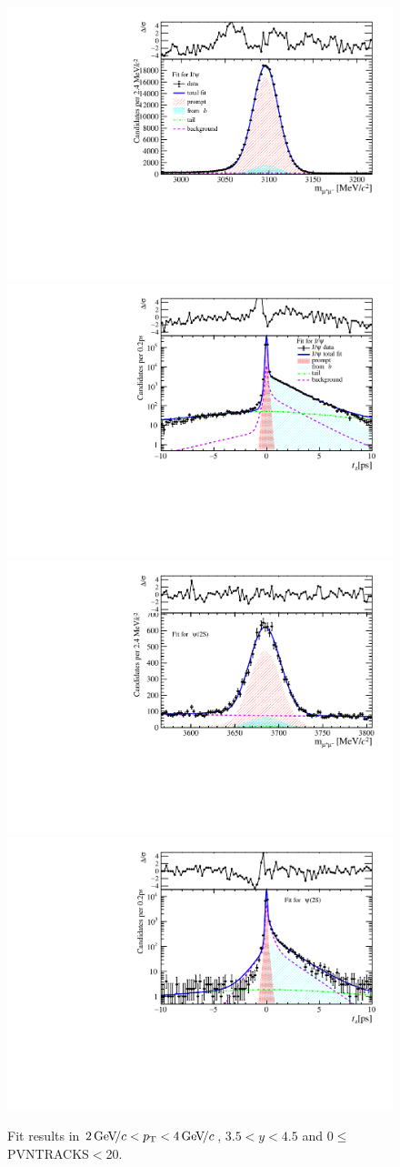 \begin{figure}[H]
\begin{center}
\includegraphics[width=0.47\linewidth]{pdf/Jpsi/drawmass/n1y3pt2.pdf}
\includegraphics[width=0.47\linewidth]{pdf/Jpsi/2DFit/n1y3pt2.pdf}
\vspace*{-0.5cm}
\includegraphics[width=0.47\linewidth]{pdf/Psi2S/drawmass/n1y3pt2.pdf}
\includegraphics[width=0.47\linewidth]{pdf/Psi2S/2DFit/n1y3pt2.pdf}
\vspace*{-0.5cm}
\end{center}
\caption{Fit results in $2\text{\,Ge\kern -0.1em V\!/}c<p_{\mathrm{T}}<4\text{\,Ge\kern -0.1em V\!/}c$, $3.5<y<4.5$ and 0$\leq$PVNTRACKS$<$20.}
\label{Fitn1y3pt2}
\end{figure}
